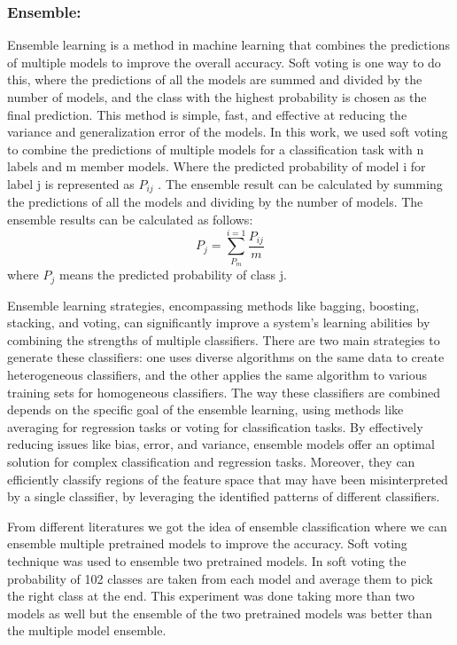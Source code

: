 \subsubsection{Ensemble:}
Ensemble learning is a method in machine learning that combines the predictions of multiple models to improve the overall accuracy. Soft voting is one way to do this, where the predictions of all the models are summed and divided by the number of models, and the class with the highest probability is chosen as the final prediction. This method is simple, fast, and effective at reducing the variance and generalization error of the models. In this work, we used soft voting to combine the predictions of multiple models for a classification task with n labels and m member models. Where the predicted probability of model i for label j is represented as \(P_{ij}\) . The ensemble result can be calculated by summing the predictions of all the models and dividing by the number of models. The ensemble results can be calculated as follows:
\begin{equation}
    P_j= \sum_{P_m}^{i=1}\frac{P_{ij}}{m}
\end{equation}
where \(P_j\) means the predicted probability of class j.

Ensemble \cite{santa2021ensemble, anwar2023exploring} learning strategies, encompassing methods like bagging, boosting, stacking, and voting, can significantly improve a system's learning abilities by combining the strengths of multiple classifiers. There are two main strategies to generate these classifiers: one uses diverse algorithms on the same data to create heterogeneous classifiers, and the other applies the same algorithm to various training sets for homogeneous classifiers. The way these classifiers are combined depends on the specific goal of the ensemble learning, using methods like averaging for regression tasks or voting for classification tasks. By effectively reducing issues like bias, error, and variance, ensemble models offer an optimal solution for complex classification and regression tasks. Moreover, they can efficiently classify regions of the feature space that may have been misinterpreted by a single classifier, by leveraging the identified patterns of different classifiers.

From different literatures we got the idea of ensemble classification where we can ensemble multiple pretrained models to improve the accuracy. Soft voting technique was used to ensemble two pretrained models. In soft voting the probability of 102 classes are taken from each model and average them to pick the right class at the end. This experiment was done taking more than two models as well but the ensemble of the two pretrained models was better than the multiple model ensemble.
